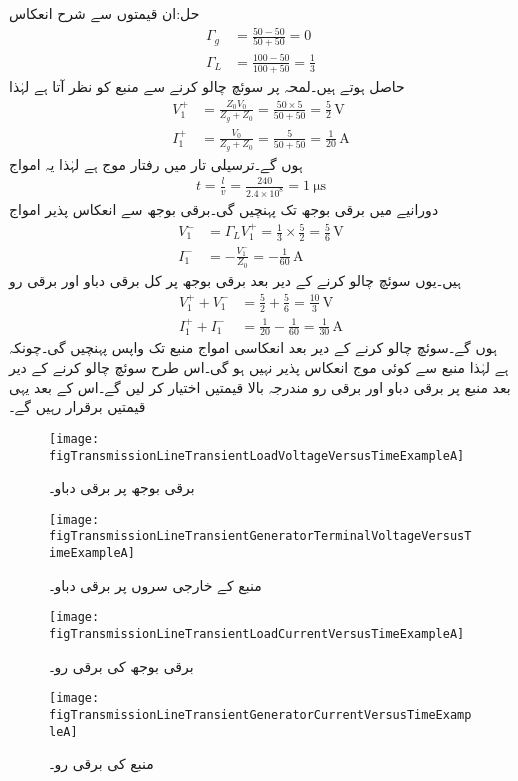 حل:ان قیمتوں سے شرح انعکاس
\begin{align*}
\Gamma_g&=\frac{50-50}{50+50}=0\\
\Gamma_L&=\frac{100-50}{100+50}=\frac{1}{3}
\end{align*}
حاصل ہوتے ہیں۔لمحہ  پر سوئچ چالو کرنے سے منبع کو  نظر آتا ہے لہٰذا
\begin{align*}
V_1^+&=\frac{Z_0 V_0}{Z_g+Z_0}=\frac{50 \times 5}{50+50}=\frac{5}{2} \, \si{\volt}\\
I_1^+&=\frac{V_0}{Z_g+Z_0}=\frac{5}{50+50}=\frac{1}{20} \, \si{\ampere}
\end{align*}
ہوں گے۔ترسیلی تار میں رفتار موج  ہے لہٰذا یہ امواج 
\begin{align*}
t=\frac{l}{v}=\frac{240}{2.4 \times 10^8}=\SI{1}{\micro\second}
\end{align*}
دورانیے میں برقی بوجھ تک پہنچیں گی۔برقی بوجھ سے انعکاس پذیر امواج
\begin{align*}
V_1^-&=\Gamma_L V_1^+=\frac{1}{3} \times \frac{5}{2}=\frac{5}{6} \, \si{\volt}\\
I_1^-&=-\frac{V_1^-}{Z_0}=-\frac{1}{60} \, \si{\ampere}
\end{align*}
ہیں۔یوں سوئچ چالو کرنے کے  دیر بعد برقی بوجھ پر کل برقی دباو اور برقی رو 
\begin{align*}
V_1^+ + V_1^- &=\frac{5}{2}+\frac{5}{6}=\frac{10}{3} \, \si{\volt}\\
I_1^+ + I_1^-&=\frac{1}{20}-\frac{1}{60}=\frac{1}{30} \, \si{\ampere}
\end{align*}
ہوں گے۔سوئچ چالو کرنے کے  دیر بعد انعکاسی امواج منبع تک واپس پہنچیں گی۔چونکہ  ہے لہٰذا منبع سے کوئی موج انعکاس پذیر نہیں ہو گی۔اس طرح سوئچ چالو کرنے کے  دیر بعد منبع پر برقی دباو اور برقی رو مندرجہ بالا قیمتیں اختیار کر لیں گے۔اس کے بعد یہی قیمتیں برقرار رہیں گے۔
\begin{figure}
\centering
\texttt{[image: figTransmissionLineTransientLoadVoltageVersusTimeExampleA]}
\caption{برقی بوجھ پر برقی دباو۔}
\label{شکل_ترسیلی_مثال_بار_دباو}
\end{figure}
%
\begin{figure}
\centering
\texttt{[image: figTransmissionLineTransientGeneratorTerminalVoltageVersusTimeExampleA]}
\caption{منبع کے خارجی سروں پر برقی دباو۔}
\label{شکل_ترسیلی_مثال_منبع_دباو}
\end{figure}
%
\begin{figure}
\centering
\texttt{[image: figTransmissionLineTransientLoadCurrentVersusTimeExampleA]}
\caption{برقی بوجھ کی برقی رو۔}
\label{شکل_ترسیلی_مثال_بار_رو}
\end{figure}
%
\begin{figure}
\centering
\texttt{[image: figTransmissionLineTransientGeneratorCurrentVersusTimeExampleA]}
\caption{منبع کی برقی رو۔}
\label{شکل_ترسیلی_مثال_منبع_رو}
\end{figure}

